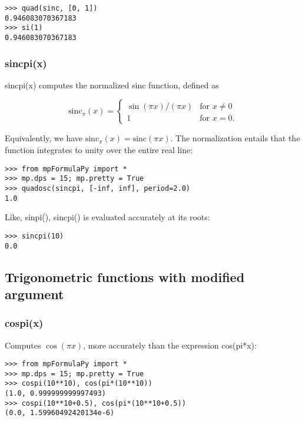 \begin{lstlisting}
>>> quad(sinc, [0, 1])
0.946083070367183
>>> si(1)
0.946083070367183
\end{lstlisting}



\subsubsection{sincpi(x)}
sincpi(x) computes the normalized sinc function, defined as

\begin{equation}
	\text{sinc}_{\pi}(x)=\begin{cases}
		\sin(\pi x)/(\pi x) & \text{for }x \ne 0\\
		1 & \text{for }x=0.
	\end{cases}
\end{equation}



Equivalently, we have  $\text{sinc}_{\pi}(x)=\text{sinc}(\pi x)$.
The normalization entails that the function integrates to unity over the entire real line:

\begin{lstlisting}
>>> from mpFormulaPy import *
>>> mp.dps = 15; mp.pretty = True
>>> quadosc(sincpi, [-inf, inf], period=2.0)
1.0
\end{lstlisting}

Like, sinpi(), sincpi() is evaluated accurately at its roots:

\begin{lstlisting}
>>> sincpi(10)
0.0
\end{lstlisting}




\subsection{Trigonometric functions with modified argument}
\subsubsection{cospi(x)}

Computes $\cos(\pi x)$, more accurately than the expression cos(pi*x):

\begin{lstlisting}
>>> from mpFormulaPy import *
>>> mp.dps = 15; mp.pretty = True
>>> cospi(10**10), cos(pi*(10**10))
(1.0, 0.999999999997493)
>>> cospi(10**10+0.5), cos(pi*(10**10+0.5))
(0.0, 1.59960492420134e-6)
\end{lstlisting}

